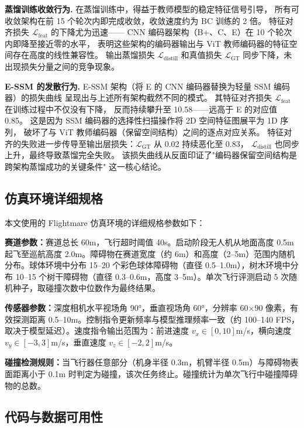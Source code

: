 \documentclass[12pt,a4paper]{article}
\numberwithin{equation}{section}
\numberwithin{figure}{section}
\numberwithin{table}{section}
\begin{document}
\textbf{蒸馏训练收敛行为.}
在蒸馏训练中，得益于教师模型的稳定特征信号引导，
所有可收敛架构在前 15 个轮次内即完成收敛，收敛速度约为 BC 训练的 2 倍。
特征对齐损失 $\mathcal{L}_{\text{feat}}$ 的下降尤为迅速——
CNN 编码器架构（B+、C、E）在 10 个轮次内即降至接近零的水平，
表明这些架构的编码器输出与 ViT 教师编码器的特征空间存在高度的线性兼容性。
输出蒸馏损失 $\mathcal{L}_{\text{distill}}$ 和真值损失 $\mathcal{L}_{\text{GT}}$
同步下降，未出现损失分量之间的竞争现象。

\textbf{E-SSM 的发散行为.}
E-SSM 架构（将 E 的 CNN 编码器替换为轻量 SSM 编码器）的损失曲线
呈现出与上述所有架构截然不同的模式。
其特征对齐损失 $\mathcal{L}_{\text{feat}}$ 在训练过程中不仅没有下降，
反而持续攀升至 10.58——远高于 E 的对应值 0.85。
这是因为 SSM 编码器的选择性扫描操作将 2D 空间特征图展平为 1D 序列，
破坏了与 ViT 教师编码器（保留空间结构）之间的逐点对应关系。
特征对齐的失败进一步传导至输出层损失：$\mathcal{L}_{\text{GT}}$ 从 0.02 持续恶化至 0.83，
$\mathcal{L}_{\text{distill}}$ 也同步上升，最终导致蒸馏完全失败。
该损失曲线从反面印证了"编码器保留空间结构是跨架构蒸馏成功的关键条件"
这一核心结论。

\subsection{仿真环境详细规格}
\label{app:env_spec}

本文使用的 Flightmare 仿真环境\cite{shah2017flightmare}的详细规格参数如下：

\textbf{赛道参数：}赛道总长 60m，飞行超时阈值 40s。启动阶段无人机从地面高度 0.5m 起飞至巡航高度 2.0m。障碍物在赛道宽度（约 6m）和高度（2--5m）范围内随机分布。球体环境中分布 15--20 个彩色球体障碍物（直径 0.5--1.0m），树木环境中分布 10--15 个树干障碍物（直径 0.3--0.6m，高度 3--5m）。单次飞行评测启动 5 次随机种子，取碰撞次数中位数作为最终结果。

\textbf{传感器参数：}深度相机水平视场角 90°，垂直视场角 60°，分辨率 60$\times$90 像素，有效探测距离 0.5--10m。控制指令更新频率与模型推理频率一致（约 100--140 FPS，取决于模型延迟）。速度指令输出范围为：前进速度 $v_x \in [0, 10]$m/s，横向速度 $v_y \in [-3, 3]$m/s，垂直速度 $v_z \in [-2, 2]$m/s。

\textbf{碰撞检测规则：}当飞行器任意部分（机身半径 0.3m，机臂半径 0.5m）与障碍物表面距离小于 0.1m 时判定为碰撞，该次任务终止。碰撞统计为单次飞行中碰撞障碍物的总数。

\subsection{代码与数据可用性}
\label{app:code}
\end{document}
